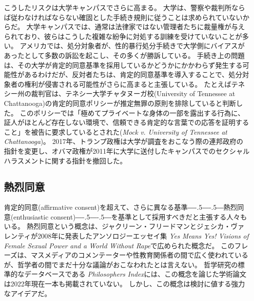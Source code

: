 \documentclass[paper=a4,book,openany]{jlreq}
\newcommand{\ig}[1]{}           %
\def\DDASH{―\kern-.5\zw―\kern-.5\zw―} %
\begin{document}
こうしたリスクは大学キャンパスでさらに高まる。
大学は、警察や裁判所ならば従わなければならない確固とした手続き規則に従うことは求められていないからだ。
大学キャンパスでは、通常は法律家ではない管理者たちに裁量権が与えられており、彼らはこうした複雑な紛争に対処する訓練を受けていないことが多い。
アメリカでは、処分対象者が、性的暴行処分手続きで大学側にバイアスがあったとして多数の訴訟を起こし、その多くが勝訴している\citep{anderson19:_more_title_ix_lawsuit_accus_accus}。
手続き上の問題は、その大学が肯定的同意基準を採用しているかどうかにかかわらず発生する可能性があるわけだが、反対者たちは、肯定的同意基準を導入することで、処分対象者の権利が侵害される可能性がさらに高まると主張している。
たとえばテネシー州の裁判官は、テネシー大学チャタヌーガ校(University of Tennessee at Chattanooga)の肯定的同意ポリシーが推定無罪の原則を排除していると判断した。
このポリシーでは「極めてプライベートな身体の一部を露出する行為に、証人がほとんど存在しない環境で、信頼できる肯定的な言葉での応答を証明すること」を被告に要求しているとされた(\emph{Mock v. University of Tennessee at Chattanooga}\ig{, No. 14-1687-II, Tenn. Ch. Ct. 10 August 2015\footnote{\url{https://kcjohnson.files.wordpress.com/2013/08/memorandum-mock.pdf}.}})。
2017年、トランプ政権は大学が調査をおこなう際の連邦政府の指針を変更し、オバマ政権が2011年に大学に送付したキャンパスでのセクシャルハラスメントに関する指針を撤回した。

\subsection{熱烈同意}

肯定的同意(affirmative consent)を超えて、さらに異なる基準{\DDASH}熱烈同意(enthusiastic consent){\DDASH}を基準として採用すべきだと主張する人々もいる。
熱烈同意という概念は、ジャクリーン・フリードマン\ig{Jaclyn Friedman}とジェシカ・ヴァレンティ\ig{Jessica Valenti}が2008年に発表したアンソロジーエッセイ集 \emph{Yes Means Yes! Visions of Female Sexual Power and a World Without Rape}で広められた概念だ\citep[pp.308--309]{friedman08:_yes_means_yes}。
このフレーズは、マスメディアのコメンテーターや性教育関係者の間で広く使われているが、哲学者の間でまだ十分な議論がおこなわれたとは言えない。
哲学研究の標準的なデータベースである \emph{Philosophers Index}には、この概念を論じた学術論文は2022年現在一本も掲載されていない。
しかし、この概念は検討に値する強力なアイデアだ。
\end{document}
